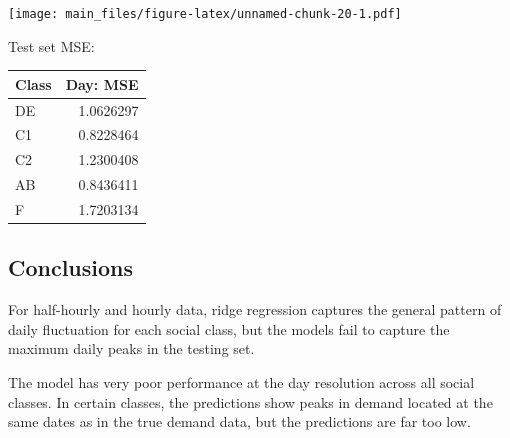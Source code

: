\documentclass[
]{article}
\newenvironment{Shaded}{\begin{snugshade}}{\end{snugshade}}
\newcommand{\AttributeTok}[1]{\textcolor[rgb]{0.13,0.29,0.53}{#1}}
\newcommand{\CommentTok}[1]{\textcolor[rgb]{0.56,0.35,0.01}{\textit{#1}}}
\newcommand{\ControlFlowTok}[1]{\textcolor[rgb]{0.13,0.29,0.53}{\textbf{#1}}}
\newcommand{\FunctionTok}[1]{\textcolor[rgb]{0.13,0.29,0.53}{\textbf{#1}}}
\newcommand{\NormalTok}[1]{#1}
\newcommand{\OtherTok}[1]{\textcolor[rgb]{0.56,0.35,0.01}{#1}}
\newcommand{\SpecialCharTok}[1]{\textcolor[rgb]{0.81,0.36,0.00}{\textbf{#1}}}
\newcommand{\StringTok}[1]{\textcolor[rgb]{0.31,0.60,0.02}{#1}}
\begin{document}
\texttt{[image: main\_files/figure-latex/unnamed-chunk-20-1.pdf]}

Test set MSE:

\begin{Shaded}
\end{Shaded}

\begin{longtable}[]{@{}lr@{}}
\toprule\noalign{}
Class & Day: MSE \\
\midrule\noalign{}
\endhead
\bottomrule\noalign{}
\endlastfoot
DE & 1.0626297 \\
C1 & 0.8228464 \\
C2 & 1.2300408 \\
AB & 0.8436411 \\
F & 1.7203134 \\
\end{longtable}

\hypertarget{conclusions}{%
\subsection{Conclusions}\label{conclusions}}

For half-hourly and hourly data, ridge regression captures the general
pattern of daily fluctuation for each social class, but the models fail
to capture the maximum daily peaks in the testing set.

The model has very poor performance at the day resolution across all
social classes. In certain classes, the predictions show peaks in demand
located at the same dates as in the true demand data, but the
predictions are far too low.
\end{document}
